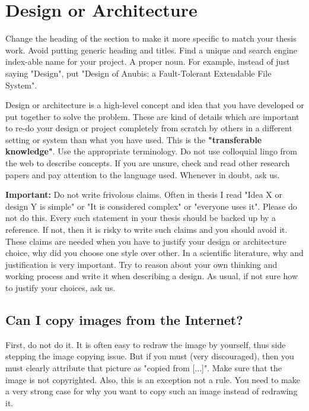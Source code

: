 \section{Design or Architecture}
Change the heading of the section to make it more specific to match your thesis work. Avoid putting generic heading and titles. Find a unique and search engine index-able name for your project. A proper noun. For example, instead of just saying "Design", put "Design of Anubis: a Fault-Tolerant  Extendable File System". 

Design or architecture is a high-level concept and idea that you have developed or put together to solve the problem. These are kind of details which are important to re-do your design or project completely from scratch by others in a different setting or system than what you have used. This is the \textbf{"transferable knowledge"}. Use the appropriate terminology. Do not use colloquial lingo from the web to describe concepts. If you are unsure, check and read other research papers and pay attention to the language used. Whenever in doubt, ask us. 


$ $\\

\noindent\textbf{Important:} Do not write frivolous claims. Often in thesis I read "Idea X or design Y is simple" or "It is considered complex" or "everyone uses it". Please do not do this. Every such statement in your thesis should be backed up by a reference. If not, then it is risky to write such claims and you should avoid it. These claims are needed when you have to justify your design or architecture choice, why did you choose one style over other. In a scientific literature, why and justification is very important. Try to reason about your own thinking and working process and write it when describing a design. As usual, if not sure how to justify your choices, ask us. 


\subsection*{Can I copy images from the Internet?}

First, do not do it. It is often easy to redraw the image by yourself, thus side stepping the image copying issue. But if you must (very discouraged), then you must clearly attribute that picture as "copied from [...]". Make sure that the image is not copyrighted. Also, this is an exception not a rule. You need to make a very strong case for why you want to copy such an image instead of redrawing it. 
